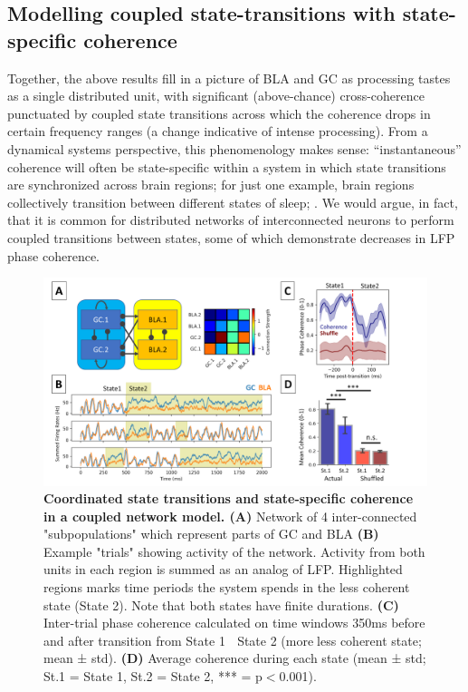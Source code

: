 \begin{refsection}
\subsection{Modelling coupled state-transitions with state-specific coherence}
Together, the above results fill in a picture of BLA and GC as processing tastes as a single distributed unit, with significant (above-chance) cross-coherence punctuated by coupled state transitions across which the coherence drops in certain frequency ranges (a change indicative of intense processing). From a dynamical systems perspective, this phenomenology makes sense: “instantaneous” coherence will often be state-specific within a system in which state transitions are synchronized across brain regions; for just one example, brain regions collectively transition between different states of sleep; \cite{stitt2017a}. We would argue, in fact, that it is common for distributed networks of interconnected neurons to perform coupled transitions between states, some of which demonstrate decreases in LFP phase coherence.

\begin{figure}
\includegraphics[width=\linewidth]{mahmood_22_figures/fig10-0.png}
\caption{\textbf{Coordinated state transitions and state-specific coherence in a coupled network model. (A)} Network of 4 inter-connected "subpopulations" which represent parts of GC and BLA \textbf{(B)} Example "trials" showing activity of the network. Activity from both units in each region is summed as an analog of LFP. Highlighted regions marks time periods the system spends in the less coherent state (State 2). Note that both states have finite durations. \textbf{(C)} Inter-trial phase coherence calculated on time windows 350ms before and after transition from State 1  State 2 (moreless coherent state; mean ± std). \textbf{(D)} Average coherence during each state (mean ± std; St.1 = State 1, St.2 = State 2, *** = p\(<\)0.001).}
\label{fig:wrapfig}
\end{figure}


\end{refsection}
